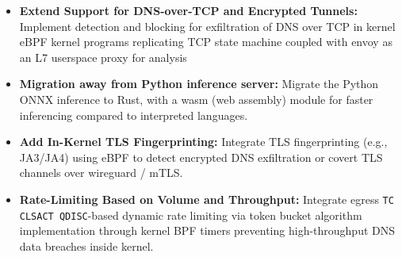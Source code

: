 \documentclass [11pt, proquest] {uwthesis}[2020/02/24]
\begin{document}
\begin{itemize}[itemsep=1pt,parsep=0pt]
  \item \textbf{Extend Support for DNS-over-TCP and Encrypted Tunnels:} Implement detection and blocking for exfiltration of DNS over TCP in kernel eBPF kernel programs replicating TCP state machine coupled with envoy as an L7 userspace proxy for analysis

  \item \textbf{Migration away from Python inference server:} Migrate the Python ONNX inference to Rust, with a wasm (web assembly) module for faster inferencing compared to interpreted languages.

  \item \textbf{Add In-Kernel TLS Fingerprinting:} Integrate TLS fingerprinting (e.g., JA3/JA4) using eBPF to detect encrypted DNS exfiltration or covert TLS channels over wireguard / mTLS.




  \item \textbf{Rate-Limiting Based on Volume and Throughput:} Integrate egress \texttt{TC CLSACT QDISC}-based dynamic rate limiting via token bucket algorithm implementation through kernel BPF timers preventing high-throughput DNS data breaches inside kernel.


\end{itemize}
\end{document}
